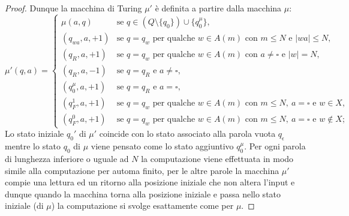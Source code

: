 \begin{lemm}
\begin{proof}
Dunque la macchina di Turing $\mu'$ è definita a partire dalla macchina $\mu$:
\[
\mu'(q,a) =
\begin{cases}
\mu(a,q) & \text{se } q \in (Q\setminus\{q_0 \} )\cup \{q_0^\mu \}, \\[4pt]
(q_{wa}, a, +1) & \text{se } q = q_w \text{ per qualche } w \in A(m) \text{ con } m \le N \text{ e } |wa| \le N, \\[4pt]
(q_R, a, +1) & \text{se } q = q_w \text{ per qualche } w \in A(m) \text{ con } a \ne \square \text{ e } |w| = N, \\[4pt]
(q_R, a, -1) & \text{se } q = q_R \text{ e } a \ne \square, \\[4pt]
(q_0^\mu, a, +1) & \text{se } q = q_R \text{ e } a = \square, \\[4pt]
(q_F^1, a, +1) & \text{se } q = q_w \text{ per qualche } w \in A(m) \text{ con } m \le N,\ a = \square \text{ e } w \in X, \\[4pt]
(q_F^0, a, +1) & \text{se } q = q_w \text{ per qualche } w \in A(m) \text{ con } m \le N,\ a = \square \text{ e } w \notin X;
\end{cases}
\]
Lo stato iniziale $q_0'$ di $\mu'$ coincide con lo stato associato alla parola vuota $q_\epsilon$ mentre lo stato $q_0$ di $\mu$ viene pensato come lo stato aggiuntivo $q_0^\mu$.
Per ogni parola di lunghezza inferiore o uguale ad $N$ la computazione viene effettuata in modo simile alla computazione per automa finito, per le altre parole la macchina $\mu'$ compie una lettura ed un ritorno alla posizione iniziale che non altera l'input e dunque quando la macchina torna alla posizione iniziale e passa nello stato iniziale (di $\mu$) la computazione si svolge esattamente come per $\mu$.
\end{proof}
\begin{figure}[H]
\centering
{}
\end{figure}
\end{lemm}
